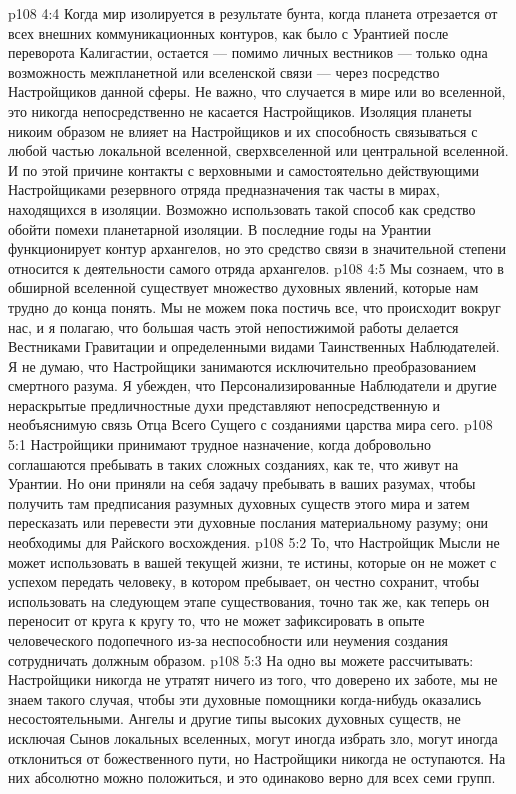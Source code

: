 \vs p108 4:4 Когда мир изолируется в результате бунта, когда планета отрезается от всех внешних коммуникационных контуров, как было с Урантией после переворота Калигастии, остается --- помимо личных вестников --- только одна возможность межпланетной или вселенской связи --- через посредство Настройщиков данной сферы. Не важно, что случается в мире или во вселенной, это никогда непосредственно не касается Настройщиков. Изоляция планеты никоим образом не влияет на Настройщиков и их способность связываться с любой частью локальной вселенной, сверхвселенной или центральной вселенной. И по этой причине контакты с верховными и самостоятельно действующими Настройщиками резервного отряда предназначения так часты в мирах, находящихся в изоляции. Возможно использовать такой способ как средство обойти помехи планетарной изоляции. В последние годы на Урантии функционирует контур архангелов, но это средство связи в значительной степени относится к деятельности самого отряда архангелов.
\vs p108 4:5 \pc Мы сознаем, что в обширной вселенной существует множество духовных явлений, которые нам трудно до конца понять. Мы не можем пока постичь все, что происходит вокруг нас, и я полагаю, что большая часть этой непостижимой работы делается Вестниками Гравитации и определенными видами Таинственных Наблюдателей. Я не думаю, что Настройщики занимаются исключительно преобразованием смертного разума. Я убежден, что Персонализированные Наблюдатели и другие нераскрытые предличностные духи представляют непосредственную и необъяснимую связь Отца Всего Сущего с созданиями царства мира сего.
\vs p108 5:1 Настройщики принимают трудное назначение, когда добровольно соглашаются пребывать в таких сложных созданиях, как те, что живут на Урантии. Но они приняли на себя задачу пребывать в ваших разумах, чтобы получить там предписания разумных духовных существ этого мира и затем пересказать или перевести эти духовные послания материальному разуму; они необходимы для Райского восхождения.
\vs p108 5:2 То, что Настройщик Мысли не может использовать в вашей текущей жизни, те истины, которые он не может с успехом передать человеку, в котором пребывает, он честно сохранит, чтобы использовать на следующем этапе существования, точно так же, как теперь он переносит от круга к кругу то, что не может зафиксировать в опыте человеческого подопечного из\hyp{}за неспособности или неумения создания сотрудничать должным образом.
\vs p108 5:3 На одно вы можете рассчитывать: Настройщики никогда не утратят ничего из того, что доверено их заботе, мы не знаем такого случая, чтобы эти духовные помощники когда\hyp{}нибудь оказались несостоятельными. Ангелы и другие типы высоких духовных существ, не исключая Сынов локальных вселенных, могут иногда избрать зло, могут иногда отклониться от божественного пути, но Настройщики никогда не оступаются. На них абсолютно можно положиться, и это одинаково верно для всех семи групп.
